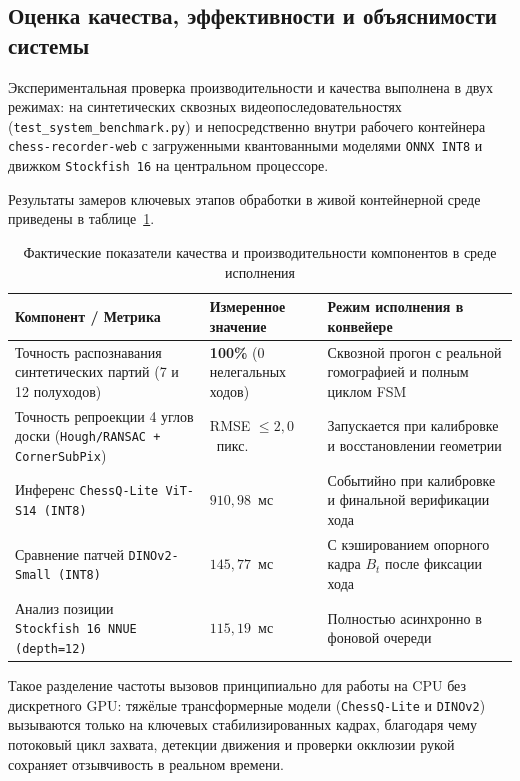 \subsection{Оценка качества, эффективности и объяснимости системы}

Экспериментальная проверка производительности и качества выполнена в двух режимах: на синтетических сквозных видеопоследовательностях (\texttt{test\_system\_benchmark.py}) и непосредственно внутри рабочего контейнера \texttt{chess-recorder-web} с загруженными квантованными моделями \texttt{ONNX INT8} и движком \texttt{Stockfish~16} на центральном процессоре.

Результаты замеров ключевых этапов обработки в живой контейнерной среде приведены в таблице~\ref{tab:paradigm-comparison}.

\begin{table}[htbp]
\centering
\caption{Фактические показатели качества и производительности компонентов в среде исполнения}
\label{tab:paradigm-comparison}
\begin{tabular}{|>{\raggedright\arraybackslash}p{}|>{\centering\arraybackslash}p{}|>{\raggedright\arraybackslash}p{}|}
\hline
\textbf{Компонент / Метрика} & \textbf{Измеренное значение} & \textbf{Режим исполнения в конвейере} \\
\hline
Точность распознавания синтетических партий (7 и 12 полуходов) & \textbf{100\%} (0 нелегальных ходов) & Сквозной прогон с реальной гомографией и полным циклом FSM \\
\hline
Точность репроекции 4 углов доски (\texttt{Hough/RANSAC + CornerSubPix}) & RMSE $\le 2{,}0$~пикс. & Запускается при калибровке и восстановлении геометрии \\
\hline
Инференс \texttt{ChessQ-Lite ViT-S14 (INT8)} & $910{,}98$~мс & Событийно при калибровке и финальной верификации хода \\
\hline
Сравнение патчей \texttt{DINOv2-Small (INT8)} & $145{,}77$~мс & С кэшированием опорного кадра $B_t$ после фиксации хода \\
\hline
Анализ позиции \texttt{Stockfish~16 NNUE (depth=12)} & $115{,}19$~мс & Полностью асинхронно в фоновой очереди \\
\hline
\end{tabular}
\end{table}

Такое разделение частоты вызовов принципиально для работы на CPU без дискретного GPU: тяжёлые трансформерные модели (\texttt{ChessQ-Lite} и \texttt{DINOv2}) вызываются только на ключевых стабилизированных кадрах, благодаря чему потоковый цикл захвата, детекции движения и проверки окклюзии рукой сохраняет отзывчивость в реальном времени.

